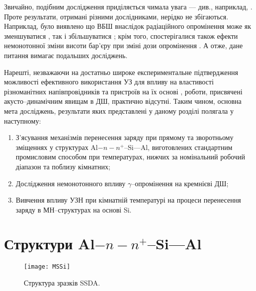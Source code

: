 
Звичайно, подібним дослідження приділяється чимала увага  --- див., наприклад,
\cite{Kumar1, Rao, Kumar2, Sharma, Ohyama, Tataroglu,Tascioglu2010old,Tataroglu:2007NIMA,Tataroglu3,Karatas:2006NIMA,Umana,Kinoshita,Vorobets,Pattabi,Kovalyuk,Verma,Abdolahpour}.
Проте результати, отримані різними дослідниками, нерідко не збігаються.
Наприклад, було виявлено що ВБШ внаслідок радіаційного опромінення може як зменшуватися \cite{Kumar1, Rao, Kumar2, Sharma, Ohyama,Tataroglu3},
так і збільшуватися \cite{Tataroglu,Tascioglu2010old,Tataroglu:2007NIMA};
крім того, спостерігалися також ефекти немонотонної зміни висоти бар'єру при зміні дози опромінення \cite{Karatas:2006NIMA,Umana,Kinoshita,Vorobets, Pattabi, Kovalyuk,Verma}.
А отже, дане питання вимагає подальших досліджень.

Нарешті, незважаючи на достатньо широке експериментальне підтвердження можливості ефективного використання УЗ для впливу на властивості різноманітних напівпровідників та
пристроїв на їх основі
\cite{Bahar2003,ZobovFTP2008,Parchinskii2006r,Roman:2007APL,Roman:2010JAP,Zaver2005,Davletova2008,Teterkin2009r,Tagaev,Pashaev2012r,YOlikhTPL2011r,Zaveryukhin2002:2},
роботи, присвячені акусто--динамічним явищам в ДШ, практично відсутні.
Таким чином, основна мета досліджень, результати яких представлені у даному розділі полягала у наступному:
\begin{enumerate}
  \item З'ясування механізмів перенесення заряду  при прямому та
    зворотньому зміщеннях у структурах Al$-n-n^+$--Si---Al, виготовлених стандартним промисловим способом при температурах, нижчих за номінальний робочий діапазон та поблизу кімнатних;
  \item Дослідження немонотонного впливу $\gamma$--опромінення на кремнієві ДШ;
  \item Вивчення впливу УЗН при кімнатній температурі на процеси перенесення заряду в МН--структурах на основі Si.
\end{enumerate}



\section{Структури Al$-n-n^+$--Si---Al\label{MSSi}}

\begin{figure}[b]
\center
\texttt{[image: MSSi]}%
\caption{\label{figMSSi}
Структура зразків SSDA.
}
\end{figure}

